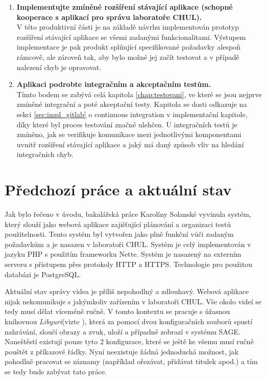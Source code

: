 \documentclass[thesis=M,czech]{FITthesis}[2012/06/26]
\begin{document}
\begin{enumerate}
	\item \textbf{Implementujte zmíněné rozšíření stávající aplikace (schopné kooperace s aplikací pro správu laboratoře
CHUL).\\}
	V této produktivní části je na základě návrhu implementován prototyp rozšíření stávající aplikace se všemi zadanými funkcionalitami. Výstupem implementace je pak produkt splňující specifikované požadavky alespoň rámcově, ale zároveň tak, aby bylo možné jej začít testovat a v případě nalezení chyb je opravovat.  
	\item \textbf{Aplikaci podrobte integračním a akceptačním testům.\\}
	Tímto bodem se zabývá celá kapitola \ref{chap:testovani}, ve které se jsou nejprve zmíněné integrační a poté akceptační testy. Kapitola se dosti odkazuje na sekci \ref{sec:impl_gitlab} o continuous integration v implementační kapitole, díky které byl proces testování značně ulehčen. U integračních testů je zmíněno, jak se verifikuje komunikace mezi jednotlivými komponentami uvnitř rozšíření stávající aplikace a jaký má daný způsob vliv na hledání integračních chyb.
\end{enumerate}

\section{Předchozí práce a aktuální stav} \label{sec:analyza_predchozi_prace}
Jak bylo řečeno v úvodu, bakalářská práce Karolíny Solanské vyvinula systém, který slouží jako webová aplikace zajišťující plánování a organizaci testů použitelnosti. Tento systém byl vytvořen jako plně funkční vůči zadaným požadavkům a je nasazen v laboratoři CHUL. Systém je celý implementován v jazyku PHP s použitím frameworku Nette. Systém je nasazený na externím serveru s přístupem přes protokoly HTTP a HTTPS. Technologie pro použitou databázi je PostgreSQL.
	
	Aktuální stav správy videa je příliš nepohodlný a zdlouhavý. Webová aplikace nijak nekomunikuje s jakýmkoliv zařízením v laboratoři CHUL. Vše okolo videí se tedy musí dělat víceméně ručně. V tomto kontextu se pracuje s úžasnou knihovnou \textit{Libyuri}(vizte \cite{yuri}), která za pomocí dvou konfiguračních souborů spustí nahrávání, sloučí obrazy a zvuk, uloží a případně zobrazí v systému SAGE. Naneštěstí existují pouze tyto 2 konfigurace, které se ještě ke všemu musí ručně pouštět z příkazové řádky. Nyní neexistuje žádná jednoduchá možnost, jak pohodlně pracovat se záznamy (například ořezávat, přidávat titulek apod.) a tím se tedy bude zabývat tato práce.
	
\end{document}
